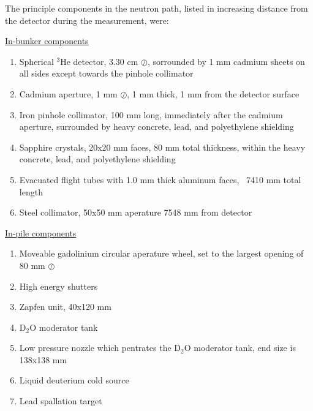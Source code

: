 \documentclass[preprint,12pt]{elsarticle}
\begin{document}
The principle components in the neutron path, listed in increasing distance from the detector during the measurement, were:

\begin{center} \underline{In-bunker components}\end{center}
\begin{enumerate}
  \item Spherical $^3$He detector, 3.30 cm $\oslash$, sorrounded by 1 mm cadmium sheets on all sides except towards the pinhole collimator
  \item Cadmium aperture, 1 mm $\oslash$, 1 mm thick, 1 mm from the detector surface
  \item Iron pinhole collimator, 100 mm long, immediately after the cadmium aperture, surrounded by heavy concrete, lead, and polyethylene shielding
  \item Sapphire crystals, 20x20 mm faces, 80 mm total thickness, within the heavy concrete, lead, and polyethylene shielding
  \item Evacuated flight tubes with 1.0 mm thick aluminum faces, ~7410 mm total length 
  \item Steel collimator, 50x50 mm aperature 7548 mm from detector
\end{enumerate}
\begin{center}\underline{In-pile components}\end{center}
\begin{enumerate}[resume]
  \item Moveable gadolinium circular aperature wheel, set to the largest opening of 80 mm $\oslash$
  \item High energy shutters
  \item Zapfen unit, 40x120 mm
  \item D$_2$O moderator tank
  \item Low pressure nozzle which pentrates the D$_2$O moderator tank, end size is 138x138 mm
  \item Liquid deuterium cold source
  \item Lead spallation target
\end{enumerate}
\end{document}
